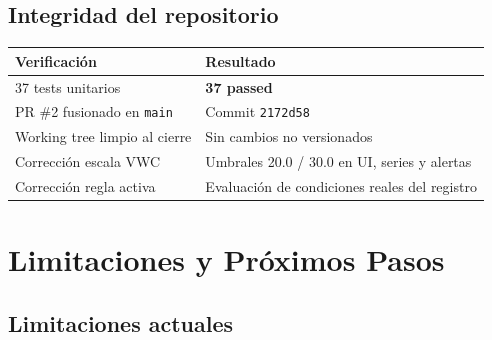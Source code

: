 \documentclass[11pt,a4paper]{article}
\begin{document}
\subsection{Integridad del repositorio}

\begin{longtable}{p{} p{}}
\toprule
\textbf{Verificación} & \textbf{Resultado} \\
\midrule
37 tests unitarios & \textcolor{samogreen}{\textbf{37 passed}} \\
PR \#2 fusionado en \texttt{main} & Commit \texttt{2172d58} \\
Working tree limpio al cierre & Sin cambios no versionados \\
Corrección escala VWC & Umbrales 20.0 / 30.0 en UI, series y alertas \\
Corrección regla activa & Evaluación de condiciones reales del registro \\
\bottomrule
\end{longtable}

\section{Limitaciones y Próximos Pasos}

\subsection{Limitaciones actuales}
\end{document}
